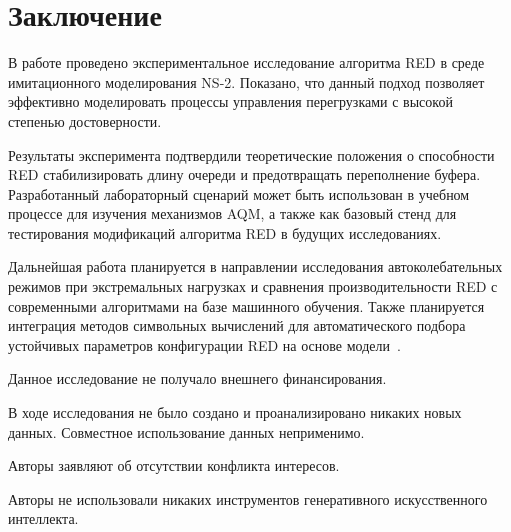 \documentclass[%
]{ittmm}
\begin{document}
\section{Заключение}

В работе проведено экспериментальное исследование алгоритма RED в среде имитационного моделирования NS-2. Показано, что данный подход позволяет эффективно моделировать процессы управления перегрузками с высокой степенью достоверности.

Результаты эксперимента подтвердили теоретические положения о способности RED стабилизировать длину очереди и предотвращать переполнение буфера. Разработанный лабораторный сценарий может быть использован в учебном процессе для изучения механизмов AQM, а также как базовый стенд для тестирования модификаций алгоритма RED в будущих исследованиях.

Дальнейшая работа планируется в направлении исследования автоколебательных режимов при экстремальных нагрузках и сравнения производительности RED с современными алгоритмами на базе машинного обучения. Также планируется интеграция методов символьных вычислений для автоматического подбора устойчивых параметров конфигурации RED на основе модели~\cite{korolkova2010phd}.


\begin{funding}
  Данное исследование не получало внешнего финансирования.
\end{funding}

\begin{dataavailability}
  В ходе исследования не было создано и проанализировано никаких новых данных. Совместное использование данных неприменимо.
\end{dataavailability}

\begin{conflictsofinterest}
  Авторы заявляют об отсутствии конфликта интересов.
\end{conflictsofinterest}


\begin{aideclaration}
  Авторы не использовали никаких инструментов генеративного искусственного интеллекта.
\end{aideclaration}

\printbibliography
\end{document}
